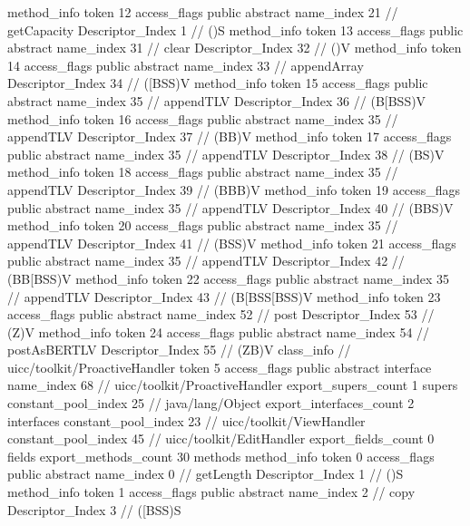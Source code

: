 {{{{{				}
				method_info {
					token	12
					access_flags	public abstract
					name_index	21		// getCapacity
					Descriptor_Index	1		// ()S
				}
				method_info {
					token	13
					access_flags	public abstract
					name_index	31		// clear
					Descriptor_Index	32		// ()V
				}
				method_info {
					token	14
					access_flags	public abstract
					name_index	33		// appendArray
					Descriptor_Index	34		// ([BSS)V
				}
				method_info {
					token	15
					access_flags	public abstract
					name_index	35		// appendTLV
					Descriptor_Index	36		// (B[BSS)V
				}
				method_info {
					token	16
					access_flags	public abstract
					name_index	35		// appendTLV
					Descriptor_Index	37		// (BB)V
				}
				method_info {
					token	17
					access_flags	public abstract
					name_index	35		// appendTLV
					Descriptor_Index	38		// (BS)V
				}
				method_info {
					token	18
					access_flags	public abstract
					name_index	35		// appendTLV
					Descriptor_Index	39		// (BBB)V
				}
				method_info {
					token	19
					access_flags	public abstract
					name_index	35		// appendTLV
					Descriptor_Index	40		// (BBS)V
				}
				method_info {
					token	20
					access_flags	public abstract
					name_index	35		// appendTLV
					Descriptor_Index	41		// (BSS)V
				}
				method_info {
					token	21
					access_flags	public abstract
					name_index	35		// appendTLV
					Descriptor_Index	42		// (BB[BSS)V
				}
				method_info {
					token	22
					access_flags	public abstract
					name_index	35		// appendTLV
					Descriptor_Index	43		// (B[BSS[BSS)V
				}
				method_info {
					token	23
					access_flags	public abstract
					name_index	52		// post
					Descriptor_Index	53		// (Z)V
				}
				method_info {
					token	24
					access_flags	public abstract
					name_index	54		// postAsBERTLV
					Descriptor_Index	55		// (ZB)V
				}
			}
		}
		class_info {		// uicc/toolkit/ProactiveHandler
			token	5
			access_flags	public abstract interface
			name_index	68		// uicc/toolkit/ProactiveHandler
			export_supers_count	1
			supers {
				constant_pool_index	25		// java/lang/Object
			}
			export_interfaces_count	2
			interfaces {
				constant_pool_index	23		// uicc/toolkit/ViewHandler
				constant_pool_index	45		// uicc/toolkit/EditHandler
			}
			export_fields_count	0
			fields {
			}
			export_methods_count	30
			methods {
				method_info {
					token	0
					access_flags	public abstract
					name_index	0		// getLength
					Descriptor_Index	1		// ()S
				}
				method_info {
					token	1
					access_flags	public abstract
					name_index	2		// copy
					Descriptor_Index	3		// ([BSS)S
				}
}}}}
